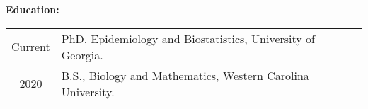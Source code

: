 \textbf{Education:}

\begin{tabular}{cl}
Current & PhD, Epidemiology and Biostatistics, University of Georgia. \\
2020 & B.S., Biology and Mathematics, Western Carolina University. \\
\end{tabular}